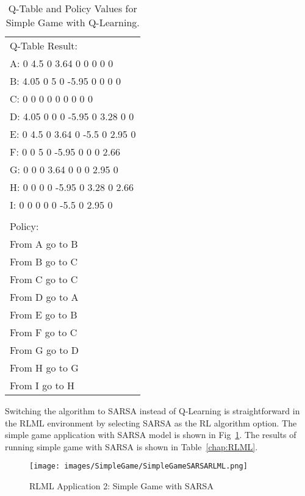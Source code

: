 \documentclass[11pt,letterpaper]{ryersonSGSThesis}
\begin{document}
\begin{ryersonSGSThesis}
    \begin{table}[h!]
    \centering
    \begin{tabular}{|l|} 
        \hline
        Q-Table Result: \\
        A:  0 4.5 0 3.64 0 0 0 0 0 \\
        B:  4.05 0 5 0 -5.95 0 0 0 0 \\
        C:  0 0 0 0 0 0 0 0 0 \\
        D:  4.05 0 0 0 -5.95 0 3.28 0 0 \\
        E:  0 4.5 0 3.64 0 -5.5 0 2.95 0 \\
        F:  0 0 5 0 -5.95 0 0 0 2.66 \\
        G:  0 0 0 3.64 0 0 0 2.95 0 \\
        H:  0 0 0 0 -5.95 0 3.28 0 2.66 \\
        I:  0 0 0 0 0 -5.5 0 2.95 0 \\
        \\
        Policy: \\
        From A go to B \\
        From B go to C \\
        From C go to C \\
        From D go to A \\
        From E go to B \\
        From F go to C \\
        From G go to D \\
        From H go to G \\
        From I go to H \\ [1ex]
        \hline
    \end{tabular}
    \caption{Q-Table and Policy Values for Simple Game with Q-Learning.} \label{table:simpleGameQTablePolicy}
    \end{table}
    
    Switching the algorithm to SARSA instead of Q-Learning is straightforward in the RLML environment by selecting SARSA as the RL algorithm option. The simple game application with SARSA model is shown in Fig~\ref{fig:SimpleGameSARSARLML}. The results of running simple game with SARSA is shown in Table~\ref{chap:RLML}.
    
    \begin{figure}[!tbh]
        \centering
        \texttt{[image: images/SimpleGame/SimpleGameSARSARLML.png]}
        \caption{RLML Application 2: Simple Game with SARSA}
        \label{fig:SimpleGameSARSARLML}
    \end{figure} 
    

\end{ryersonSGSThesis}
\end{document}
